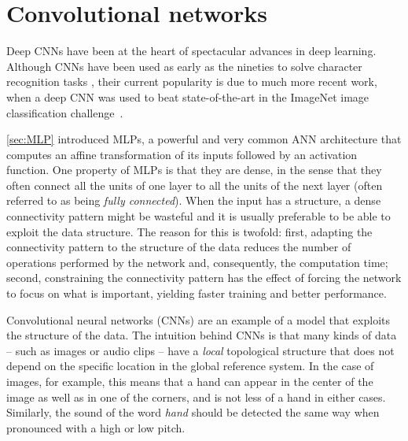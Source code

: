

\section{Convolutional networks}\label{sec:cnn}

Deep CNNs have been at the heart of spectacular advances in deep learning.
Although CNNs have been used as early as the nineties to solve character
recognition tasks \citep{le1997reading}, their current popularity is due to
much more recent work, when a deep CNN was used to beat state-of-the-art in the
ImageNet image classification challenge~\citep{krizhevsky2012imagenet}.

%
\autoref{sec:MLP} introduced MLPs, a powerful and very common ANN architecture
that computes an affine transformation of its inputs followed by an activation
function. One property of MLPs is that they are dense, in the sense that they
often connect all the units of one layer to all the units of the next layer
(often referred to as being \emph{fully connected}). When the input has a
structure, a dense connectivity pattern might be wasteful and it is usually
preferable to be able to exploit the data structure. The reason for this is
twofold: first, adapting the connectivity pattern to the structure of the data
reduces the number of operations performed by the network and, consequently,
the computation time; second, constraining the connectivity pattern has the
effect of forcing the network to focus on what is important, yielding faster
training and better performance.

Convolutional neural networks (CNNs) are an example of a model that exploits
the structure of the data. The intuition behind CNNs is that many kinds of data
-- such as images or audio clips -- have a \emph{local} topological structure
that does not depend on the specific location in the global reference system.
In the case of images, for example, this means that a hand can appear in the
center of the image as well as in one of the corners, and is not less of a hand
in either cases. Similarly, the sound of the word \emph{hand} should be
detected the same way when pronounced with a high or low pitch.


